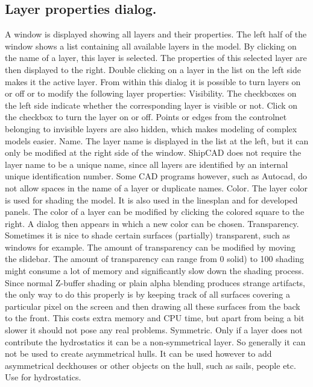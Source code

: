 \documentclass[12pt]{article}
\begin{document}
\subsection{Layer properties dialog.}
A window is displayed showing all layers and
their properties. The left half of the window shows
a list containing all available layers in the model.
By clicking on the name of a layer, this layer is
selected. The properties of this selected layer are
then displayed to the right. Double clicking on a
layer in the list on the left side makes it the active
layer. From within this dialog it is possible to turn
layers on or off or to modify the following layer
properties:
Visibility.
The checkboxes on the left side indicate
whether the corresponding layer is visible
or not. Click on the checkbox to turn the layer on or off. Points or edges from the controlnet
belonging to invisible layers are also hidden, which makes modeling of complex models
easier.
Name.
The layer name is displayed in the list at the left, but it can only be modified at the right side
of the window. ShipCAD does not require the layer name to be a unique name, since all
layers are identified by an internal unique identification number. Some CAD programs
however, such as Autocad, do not allow spaces in the name of a layer or duplicate names.
Color.
The layer color is used for shading the model. It is also used in the linesplan and for
developed panels. The color of a layer can be modified by clicking the colored square to the
right. A dialog then appears in which a new color can be chosen.
Transparency.
Sometimes it is nice to shade certain surfaces (partially)
transparent, such as windows for example. The amount
of transparency can be modified by moving the slidebar.
The amount of transparency can range from 0%
solid) to 100%
shading might consume a lot of memory and
significantly slow down the shading process. Since
normal Z-buffer shading or plain alpha blending
produces strange artifacts, the only way to do this
properly is by keeping track of all surfaces covering a particular pixel on the screen and then
drawing all these surfaces from the back to the front. This costs extra memory and CPU
time, but apart from being a bit slower it should not pose any real problems.
Symmetric.
Only if a layer does not contribute the hydrostatics it can be a non-symmetrical layer. So
generally it can not be used to create asymmetrical hulls. It can be used however to add
asymmetrical deckhouses or other objects on the hull, such as sails, people etc.
Use for hydrostatics.
\end{document}
